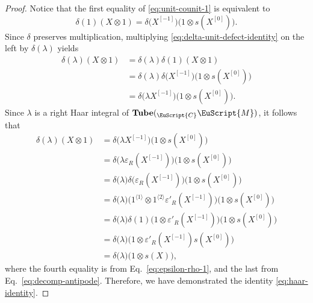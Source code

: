 \documentclass[a4paper,11pt]{article}
\theoremstyle{definition}
\theoremstyle{remark}
\newcommand\eC           {\EuScript{C}}
\newcommand\eM          {\EuScript{M}}
\begin{document}
\begin{proof}
Notice that the first equality of \eqref{eq:unit-counit-1} is equivalent to 
\begin{equation}\label{eq:delta-unit-defect-identity}
    \delta(1)(X\otimes 1) = \delta\bigl(X^{[-1]}\bigr) \bigl(1\otimes s(X^{[0]})\bigr).
\end{equation}
Since $\delta$ preserves multiplication, multiplying \eqref{eq:delta-unit-defect-identity} on the left by
$\delta(\lambda)$ yields 
\begin{align}
\delta(\lambda)(X\otimes 1) &= \delta(\lambda)\delta(1)(X\otimes 1) \nonumber \\
&= \delta(\lambda)\delta\bigl(X^{[-1]}\bigr) \bigl(1\otimes s(X^{[0]})\bigr) \nonumber \\
&=\delta\bigl(\lambda X^{[-1]}\bigr) \bigl(1\otimes s(X^{[0]})\bigr).
\end{align}
Since $\lambda$ is a right Haar integral of
$\mathbf{Tube}({}_{\eC}\eM)$, it follows that 
\begin{align}
    \delta(\lambda)(X\otimes 1) & =\delta\bigl(\lambda X^{[-1]}\bigr) \bigl(1\otimes s(X^{[0]})\bigr) \nonumber \\ 
    & = \delta\bigl(\lambda \varepsilon_R(X^{[-1]})\bigr) \bigl(1\otimes s(X^{[0]})\bigr) \nonumber \\
    & = \delta\bigl(\lambda)\delta(\varepsilon_R(X^{[-1]})\bigr) \bigl(1\otimes s(X^{[0]})\bigr) \nonumber \\
    & = \delta\bigl(\lambda)(1^{\langle 1 \rangle}\otimes 1^{\langle 2 \rangle}\varepsilon'_R(X^{[-1]})\bigr) \bigl(1\otimes s(X^{[0]})\bigr) \nonumber  \\
    & = \delta\bigl(\lambda)\delta(1) (1\otimes \varepsilon'_R(X^{[-1]})\bigr) \bigl(1\otimes s(X^{[0]})\bigr) \nonumber \\
     & = \delta\bigl(\lambda) \bigl(1\otimes \varepsilon'_R(X^{[-1]})s(X^{[0]})\bigr) \nonumber \\
     & = \delta\bigl(\lambda) \bigl(1\otimes s(X)\bigr), 
\end{align}
where the fourth equality is from Eq.~\eqref{eq:epsilon-rho-1}, and the last from Eq.~\eqref{eq:decomp-antipode}. 
Therefore, we have demonstrated the identity \eqref{eq:haar-identity}. 


\end{proof}
\end{document}
